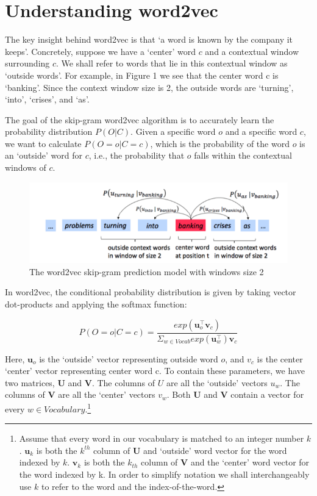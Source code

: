 \documentclass{article}
\begin{document}
	
	\section{Understanding word2vec}
	
	The key insight behind word2vec is that `a word is known by the company it keeps'. Concretely, suppose we have a `center' word $c$ and a contextual window surrounding $c$. We shall refer to words that lie in this contextual window as `outside words'. For example, in Figure 1 we see that the center word c is `banking'. Since the context window size is 2, the outside words are `turning', `into', `crises', and `as'.
	
	The goal of the skip-gram word2vec algorithm is to accurately learn the probability distribution $P(O|C)$. Given a specific word $o$ and a specific word $c$, we want to calculate $P(O=o|C=c)$, which is the probability of the word $o$ is an `outside' word for $c$, i.e., the probability that $o$ falls within the contextual windows of $c$. 
	
	\begin{figure}[h]
		\centering
		\includegraphics[width=0.7\linewidth]{skip-gram}
		\caption{The word2vec skip-gram prediction model with windows size 2}
		\label{fig:skip-gram}
	\end{figure}

	In word2vec, the conditional probability distribution is given by taking vector dot-products and applying the softmax function:
	
	\begin{equation}
		P(O=o|C=c) = \frac{exp(\bm{u}_o^\top \bm{v}_c)}{\Sigma_{w \in {Vocab}} exp(\bm{u}_w^\top)\bm{v}_c}	
		\label{eq:softmax}
	\end{equation}
	
	Here, $\bm{u}_o$ is the `outside' vector representing outside word $o$, and $v_c$ is the center `center' vector representing center word c. To contain these parameters, we have two matrices, $\bm{U}$ and $\bm{V}$. The columns of $U$ are all the `outside' vectors $u_w$. The columns of $\bm{V}$ are all the `center' vectors $v_w$. Both $\bm{U}$ and $\bm{V}$ contain a vector for every $w \in Vocabulary$.\footnote{Assume that every word in our vocabulary is matched to an integer number $k$. $\bm{u}_k$ is both the $k^{th}$ column of $\bm{U}$ and `outside' word vector for the word indexed by $k$. $\bm{v}_k$ is both the $k_{th}$ column of $\bm{V}$ and the `center' word vector for the word indexed by k. In order to simplify notation we shall interchangeably use $k$ to refer to the word and the index-of-the-word.}
	
\end{document}
